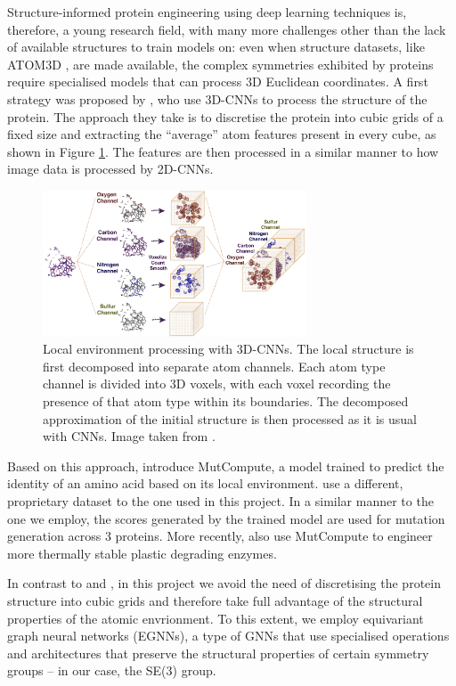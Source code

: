 Structure-informed protein engineering using deep learning techniques is, therefore, a young research field, with many more challenges other than the lack of available structures to train models on: even when structure datasets, like ATOM3D \cite{atom-3d}, are made available, the complex symmetries exhibited by proteins require specialised models that can process 3D Euclidean coordinates. A first strategy was proposed by \citet{torng20173d}, who use 3D-CNNs to process the structure of the protein. 
The approach they take is to discretise the protein into cubic grids of a fixed size and extracting the ``average'' atom features present in every cube, as shown in Figure \ref{3d-cnn}. The features are then processed in a similar manner to how image data is processed by 2D-CNNs. 
\begin{figure}[!htb]
    \centering
    \includegraphics[width=0.7\textwidth]{masters-report/figures/3d-cnn.png}
    \caption{Local environment processing with 3D-CNNs. The local structure is first decomposed into separate atom channels. Each atom type channel is divided into 3D voxels, with each voxel recording the presence of that atom type within its boundaries. The decomposed approximation of the initial structure is then processed as it is usual with CNNs. Image taken from \cite{torng20173d}.}
    \label{3d-cnn}
\end{figure}

Based on this approach, \citet{mutcompute} introduce MutCompute, a model trained to predict the identity of an amino acid based on its local environment. \citet{mutcompute} use a different, proprietary dataset to the one used in this project. In a similar manner to the one we employ, the scores generated by the trained model are used for mutation generation across 3 proteins. More recently, \citet{Lu2022} also use MutCompute to engineer more thermally stable plastic degrading enzymes. 

In contrast to \citet{mutcompute} and \citet{Lu2022}, in this project we avoid the need of discretising the protein structure into cubic grids and therefore take full advantage of the structural properties of the atomic envrionment. To this extent, we employ equivariant graph neural networks (EGNNs), a type of GNNs that use specialised operations and architectures that preserve the structural properties of certain symmetry groups – in our case, the SE(3) group. 

